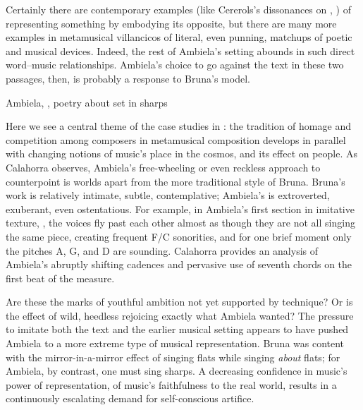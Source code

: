 Certainly there are contemporary examples (like Cererols's dissonances on
, ) of
representing something by embodying its opposite, but there are many more
examples in metamusical villancicos of literal, even punning, matchups of
poetic and musical devices. 
Indeed, the rest of Ambiela's setting abounds in such direct word--music
relationships.
Ambiela's choice to go against the text in these two passages, then, is
probably a response to Bruna's model.


\begin{musicexample}
    \caption{Ambiela, , poetry about 
    set in sharps} 
    \label{mus:Ambiela-Suban_las_voces-bemoles}
\end{musicexample}

Here we see a central theme of the case studies in
: the tradition of homage and competition among
composers in metamusical composition develops in parallel with changing notions
of music's place in the cosmos, and its effect on people.
As Calahorra observes, Ambiela's free-wheeling or even reckless approach to
counterpoint is worlds apart from the more traditional style of Bruna.
Bruna's work is relatively intimate, subtle, contemplative; Ambiela's is
extroverted, exuberant, even ostentatious.
For example, in Ambiela's first section in imitative texture, ,
the voices fly past each other almost as though they are not all singing the
same piece, creating frequent F\na{}/C\sh{} sonorities, and for one brief
moment only the pitches A, G, and D are sounding.
Calahorra provides an analysis of Ambiela's abruptly shifting cadences and
pervasive use of seventh chords on the first beat of the measure.

Are these the marks of youthful ambition not yet supported by technique?
Or is the effect of wild, heedless rejoicing exactly what Ambiela wanted?
The pressure to imitate both the text and the earlier musical setting appears
to have pushed Ambiela to a more extreme type of musical representation.
Bruna was content with the mirror-in-a-mirror effect of singing flats while
singing \emph{about} flats; for Ambiela, by contrast, one must sing sharps.
A decreasing confidence in music's power of representation, of music's
faithfulness to the real world, results in a continuously escalating demand for
self-conscious artifice.  

